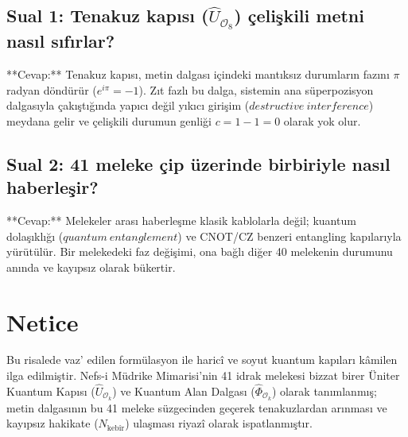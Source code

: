 \documentclass[11pt, a4paper]{article}
\begin{document}
\subsection{Sual 1: Tenakuz kapısı ($\hat{U}_{\mathcal{O}_8}$) çelişkili metni nasıl sıfırlar?}
**Cevap:** Tenakuz kapısı, metin dalgası içindeki mantıksız durumların fazını $\pi$ radyan döndürür ($e^{i\pi} = -1$). Zıt fazlı bu dalga, sistemin ana süperpozisyon dalgasıyla çakıştığında yapıcı değil yıkıcı girişim ($destructive\ interference$) meydana gelir ve çelişkili durumun genliği $c = 1 - 1 = 0$ olarak yok olur.

\subsection{Sual 2: 41 meleke çip üzerinde birbiriyle nasıl haberleşir?}
**Cevap:** Melekeler arası haberleşme klasik kablolarla değil; kuantum dolaşıklığı ($quantum\ entanglement$) ve CNOT/CZ benzeri entangling kapılarıyla yürütülür. Bir melekedeki faz değişimi, ona bağlı diğer 40 melekenin durumunu anında ve kayıpsız olarak bükertir.

\section{Netice}

Bu risalede vaz' edilen formülasyon ile haricî ve soyut kuantum kapıları kâmilen ilga edilmiştir. Nefs-i Müdrike Mimarisi'nin 41 idrak melekesi bizzat birer Üniter Kuantum Kapısı ($\hat{U}_{\mathcal{O}_k}$) ve Kuantum Alan Dalgası ($\hat{\Phi}_{\mathcal{O}_k}$) olarak tanımlanmış; metin dalgasının bu 41 meleke süzgecinden geçerek tenakuzlardan arınması ve kayıpsız hakikate ($N_{\text{kebîr}}$) ulaşması riyazî olarak ispatlanmıştır.
\end{document}

